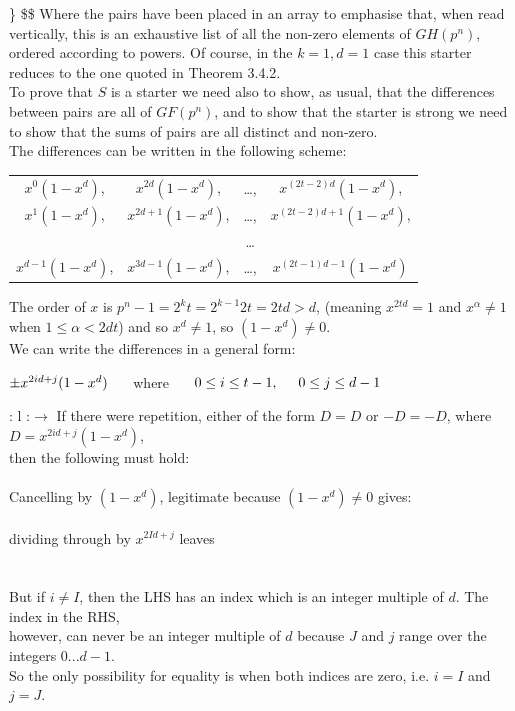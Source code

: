 \documentclass[
  12pt,
  a4paper]{book}
\begin{document}
\} \$\$ Where the pairs have been placed in an array to emphasise that,
when read vertically, this is an exhaustive list of all the non-zero
elements of \(GH(p^n)\), ordered according to powers. Of course, in the
\(k=1,d=1\) case this starter reduces to the one quoted in Theorem
3.4.2.\\
To prove that \(S\) is a starter we need also to show, as usual, that
the differences between pairs are all of \(GF(p^n)\), and to show that
the starter is strong we need to show that the sums of pairs are all
distinct and non-zero.\\
The differences can be written in the following scheme:

\begin{longtable}[]{@{}cccc@{}}
\toprule
\endhead
\(x^0(1-x^d)\), & \(x^{2d}(1-x^d)\), & \ldots, &
\(x^{(2t-2)d}(1-x^d)\),\tabularnewline
\(x^1(1-x^d)\), & \(x^{2d+1}(1-x^d)\), & \ldots, &
\(x^{(2t-2)d+1}(1-x^d)\),\tabularnewline
& & \ldots{} &\tabularnewline
\(x^{d-1}(1-x^d)\), & \(x^{3d-1}(1-x^d)\), & \ldots, &
\(x^{(2t-1)d-1}(1-x^d)\)\tabularnewline
\bottomrule
\end{longtable}

The order of \(x\) is \(p^n-1=2^kt=2^{k-1}2t=2td > d\), (meaning
\(x^{2td}=1\) and \(x^\alpha \neq 1\) when \(1 \leq \alpha < 2dt\)) and
so \(x^d \neq 1\), so \((1-x^d) \neq 0\).\\
We can write the differences in a general form:

\(\pm x^{2id+j}(1-x^d) \hspace{0.5cm}\) where
\(\hspace{0.5cm} 0 \leq i \leq t-1, \hspace{0.5cm} 0 \leq j \leq d-1\)

{: l :}\(\rightarrow\) If there were repetition, either of the form
\(D=D\) or \(-D=-D\), where \(D=x^{2id+j}(1-x^d)\),\\
then the following must hold:\\
~\\
Cancelling by \((1-x^d)\), legitimate because \((1-x^d) \neq 0\)
gives:\\
~\\
dividing through by \(x^{2Id+j}\) leaves\\
~\\
~\\
But if \(i \neq I\), then the LHS has an index which is an integer
multiple of \(d\). The index in the RHS,\\
however, can never be an integer multiple of \(d\) because \(J\) and
\(j\) range over the integers \(0...d-1\).\\
So the only possibility for equality is when both indices are zero, i.e.
\(i=I\) and \(j=J\).\\
\end{document}
